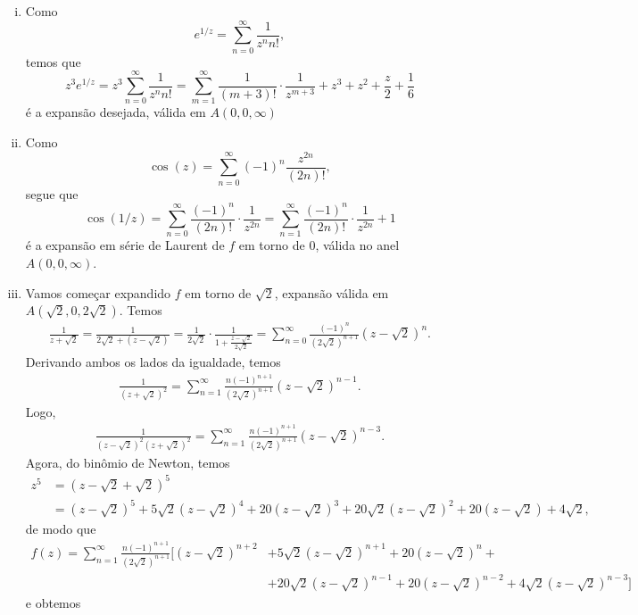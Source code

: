\documentclass[12pt,a4paper]{article}
\begin{document}
\begin{enumerate}
\begin{enumerate}[(i)]
			\item Como
			$$
			e^{1/z} = \sum_{n=0}^{\infty}\frac{1}{z^nn!},
			$$
			temos que 
			$$
			z^3e^{1/z} = z^3\sum_{n=0}^{\infty}\frac{1}{z^nn!} = \sum_{m=1}^{\infty}\frac{1}{(m+3)!}\cdot\frac{1}{z^{m+3}} + z^3 + z^2 + \frac{z}{2} + \frac{1}{6}
			$$
			é a expansão desejada, válida em $A(0,0,\infty)$
			
			\item Como 
			$$
			\cos(z) = \sum_{n=0}^{\infty}(-1)^n\frac{z^{2n}}{(2n)!},
			$$
			segue que
			$$
			\cos(1/z) = \sum_{n=0}^{\infty}\frac{(-1)^n}{(2n)!}\cdot\frac{1}{z^{2n}} = \sum_{n=1}^{\infty}\frac{(-1)^n}{(2n)!}\cdot\frac{1}{z^{2n}} + 1
			$$
			é a expansão em série de Laurent de $f$ em torno de $0$, válida no anel $A(0,0,\infty)$.
			
			\item Vamos começar expandido $f$ em torno de $\sqrt{2}$, expansão válida em $A(\sqrt{2},0,2\sqrt{2})$. Temos
			\begin{align*}
			\frac{1}{z+\sqrt{2}} = \frac{1}{2\sqrt{2} + (z-\sqrt{2})} = \frac{1}{2\sqrt{2}}\cdot\frac{1}{1 + \frac{z-\sqrt{2}}{2\sqrt{2}}} = \sum_{n=0}^{\infty}\frac{(-1)^n}{(2\sqrt{2})^{n+1}}(z-\sqrt{2})^n.
			\end{align*}
			Derivando ambos os lados da igualdade, temos
			\begin{align*}
			\frac{1}{(z+\sqrt{2})^2} = \sum_{n=1}^{\infty}\frac{n(-1)^{n+1}}{(2\sqrt{2})^{n+1}}(z-\sqrt{2})^{n-1}.
			\end{align*}
			Logo,
			\begin{align*}
			\frac{1}{(z-\sqrt{2})^2(z+\sqrt{2})^2} = \sum_{n=1}^{\infty}\frac{n(-1)^{n+1}}{(2\sqrt{2})^{n+1}}(z-\sqrt{2})^{n-3}.
			\end{align*}
			Agora, do binômio de Newton, temos
			\begin{align*} 
			z^5 &= (z-\sqrt{2} + \sqrt{2})^5 \\ 
			&= (z-\sqrt{2})^5 + 5\sqrt{2}(z-\sqrt{2})^4 + 20(z-\sqrt{2})^3 + 20\sqrt{2}(z-\sqrt{2})^2 + 20(z-\sqrt{2}) + 4\sqrt{2},
			\end{align*}
			de modo que 
			\begin{align*}
			f(z) = \sum_{n=1}^{\infty}\frac{n(-1)^{n+1}}{(2\sqrt{2})^{n+1}} [(z-\sqrt{2})^{n+2} &+ 5\sqrt{2}(z-\sqrt{2})^{n+1} + 20(z-\sqrt{2})^n + \\ 
			&+ 20\sqrt{2}(z-\sqrt{2})^{n-1} + 20(z-\sqrt{2})^{n-2} + 4\sqrt{2}(z-\sqrt{2})^{n-3} ] 
			\end{align*} 
			e obtemos
			\begin{align*}

\end{align*}
\end{enumerate}
\end{enumerate}
\end{document}
